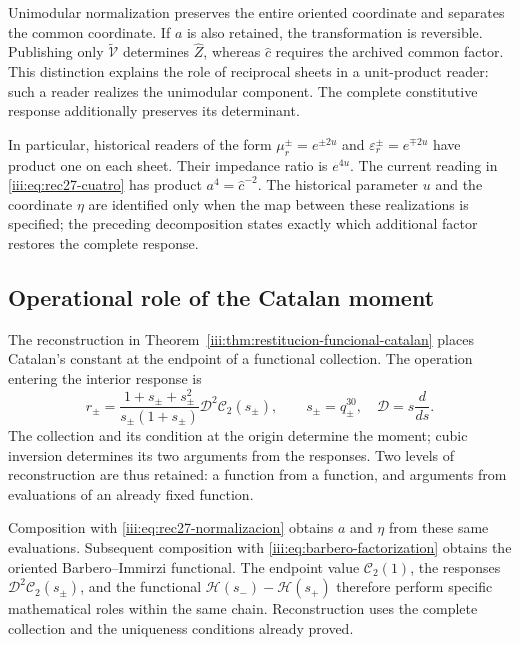 Unimodular normalization preserves the entire oriented coordinate and
separates the common coordinate. If $a$ is also retained, the transformation
is reversible. Publishing only $\widetilde{\mathcal V}$ determines
$\widehat Z$, whereas $\widehat c$ requires the archived common factor.
This distinction explains the role of reciprocal sheets in a unit-product
reader: such a reader realizes the unimodular component. The complete
constitutive response additionally preserves its determinant.

In particular, historical readers of the form
$\mu_r^\pm=e^{\pm2u}$ and $\varepsilon_r^\pm=e^{\mp2u}$
have product one on each sheet. Their impedance ratio is $e^{4u}$.
The current reading in \eqref{iii:eq:rec27-cuatro} has product
$a^4=\widehat c^{-2}$. The historical parameter $u$ and the coordinate
$\eta$ are identified only when the map between these realizations is
specified; the preceding decomposition states exactly which additional
factor restores the complete response.

\subsection{Operational role of the Catalan moment}

The reconstruction in
Theorem~\ref{iii:thm:restitucion-funcional-catalan} places Catalan's
constant at the endpoint of a functional collection. The operation entering
the interior response is
\begin{equation}
 r_\pm=
 \frac{1+s_\pm+s_\pm^2}{s_\pm(1+s_\pm)}
 \mathcal D^2\mathcal C_2(s_\pm),\qquad
 s_\pm=q_\pm^{30},\quad \mathcal D=s\frac{d}{ds}.
 \label{iii:eq:rec27-catalan-operativo}
\end{equation}
The collection and its condition at the origin determine the moment;
cubic inversion determines its two arguments from the responses.
Two levels of reconstruction are thus retained: a function from a function,
and arguments from evaluations of an already fixed function.

Composition with \eqref{iii:eq:rec27-normalizacion} obtains $a$ and
$\eta$ from these same evaluations. Subsequent composition with
\eqref{iii:eq:barbero-factorization} obtains the oriented
Barbero--Immirzi functional. The endpoint value $\mathcal C_2(1)$,
the responses $\mathcal D^2\mathcal C_2(s_\pm)$, and the functional
$\mathcal H(s_-)-\mathcal H(s_+)$ therefore perform specific
mathematical roles within the same chain. Reconstruction uses the
complete collection and the uniqueness conditions already proved.

